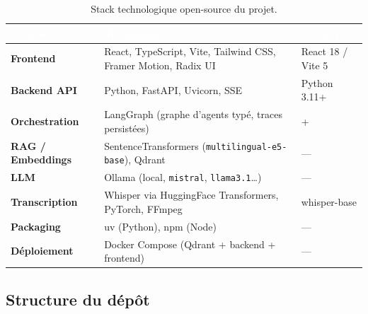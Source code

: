 \documentclass[11pt, a4paper]{article}
\begin{document}
\begin{table}[H]
    \centering
    \sffamily\renewcommand{\arraystretch}{1.35}
    \begin{tabularx}{\textwidth}{>{\bfseries}p{2.5cm} X >{\centering\arraybackslash}p{2.5cm}}
        \toprule
        \rowcolor{mypurple}
        \textcolor{white}{Couche} & \textcolor{white}{Technologies} & \textcolor{white}{Version} \\
        \midrule
        Frontend & React, TypeScript, Vite, Tailwind CSS, Framer Motion, Radix UI & React 18 / Vite 5 \\
        \rowcolor{codegray}
        Backend API & Python, FastAPI, Uvicorn, SSE & Python 3.11+ \\
        Orchestration & LangGraph (graphe d'agents typé, traces persistées) & 0.2+ \\
        \rowcolor{codegray}
        RAG / Embeddings & SentenceTransformers (\texttt{multilingual-e5-base}), Qdrant & --- \\
        LLM & Ollama (local, \texttt{mistral}, \texttt{llama3.1}…) & --- \\
        \rowcolor{codegray}
        Transcription & Whisper via HuggingFace Transformers, PyTorch, FFmpeg & whisper-base \\
        Packaging & uv (Python), npm (Node) & --- \\
        \rowcolor{codegray}
        Déploiement & Docker Compose (Qdrant + backend + frontend) & --- \\
        \bottomrule
    \end{tabularx}
    \caption{Stack technologique open-source du projet.}
\end{table}

\subsection{Structure du dépôt}
\end{document}
